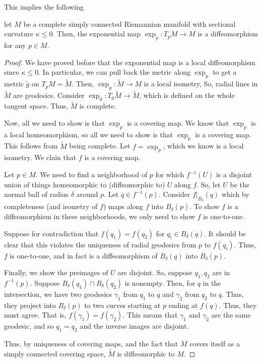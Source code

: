 \documentclass[../main.tex]{subfiles}
\begin{document}
This implies the following
\begin{theorem}
    let $M$ be a complete simply connected Riemannian manifold with sectional
    curvature $\kappa\leq 0$. Then, the exponential map $\exp_p:T_pM\to M$ is a
    diffeomorphism for any $p\in M$. 
    \label{Hadamard Theorem}
\end{theorem}
\begin{proof}
    We have proved before that the exponential map is a local diffeomorphism
    since $\kappa\leq 0$. In particular, we can pull back the metric along
    $\exp_p$ to get a metric $\tilde{g}$ on $T_pM = \tilde{M}$. Then,
    $\exp_p:\tilde{M}\to M$ is a local isometry, So, radial lines in
    $\tilde{M}$ are geodesics. Consider $\exp_0:T_0\tilde{M}\to \tilde{M}$,
    which is defined on the whole tangent space. Thus, $\tilde{M}$ is complete.
    
    Now, all we need to show is that $\exp_p$ is a covering map. We know that
    $\exp_p$ is a local homeomorphism, so all we need to show is that $\exp_p$
    is a covering map. This follows from $\tilde{M}$ being complete. Let
    $f=\exp_p$, which we know is a local isometry. We clain that $f$ is a
    covering map.

    Let $p\in M$. We need to find a neighborhood of $p$ for which $f^{-1}(U)$ is
    a disjoint union of things homeomorphic to (diffeomorphic to) $U$ along $f$.
    So, let $U$ be the normal ball of radius $\delta$ around $p$. Let $q\in
    f^{-1}(p)$. Consider $f|_{B_{\delta}}(q)$ which by completeness (and
    isometry of $f$) maps along $f$ into $B_{\delta}(p)$. To show $f$ is a
    diffeomorphism in these neighborhoods, we only need to show $f$ is
    one-to-one.

    Suppose for contradiction that $f(q_1) = f(q_2)$ for $q_i\in
    B_{\delta}(q)$. It should be clear that this violates the uniqueness of
    radial geodesics from $p$ to $f(q_i)$. Thus, $f$ is one-to-one, and in fact
    is a diffeomorphism of $B_{\delta}(q)$ into $B_{\delta}(p)$. 

    Finally, we show the preimages of $U$ are disjoint. So, suppose $q_1,q_2$
    are in $f^{-1}(p)$. Suppose $B_{\delta}(q_1)\cap B_{\delta}(q_2)$ is
    nonempty. Then, for $q$ in the intersection, we have two geodesics
    $\gamma_1$ from $q_1$ to $q$ and $\gamma_2$ from $q_2$ to $q$. Thus, they
    project into $B_{\delta}(p)$ to two curves starting at $p$ ending at $f(q)$.
    Thus, they must agree. That is, $f(\gamma_1) = f(\gamma_2)$. This means that
    $\gamma_1$ and $\gamma_2$ are the same geodesic, and so $q_1=q_2$ and the
    inverse images are disjoint.

    Thus, by uniqueness of covering maps, and the fact that $M$ covers itself as
    a simply connected covering space, $\tilde{M}$ is diffeomorphic to $M$.
\end{proof}
\end{document}
